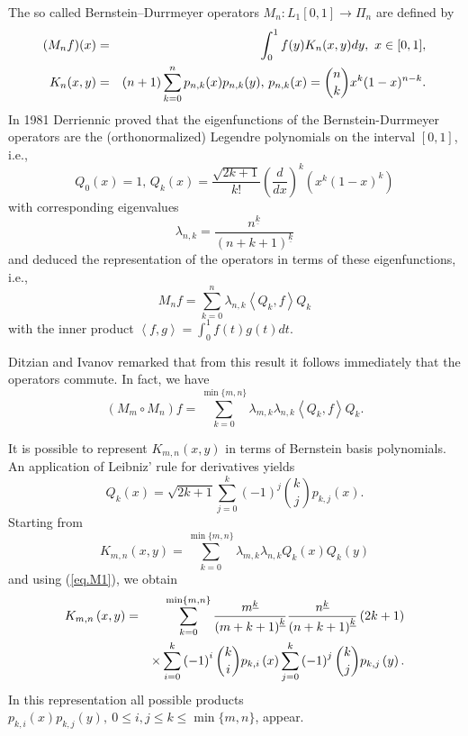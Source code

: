 \documentclass[12pt,reqno]{article}
\begin{document}
The so called Bernstein--Durrmeyer operators $M_{n}:L_{1}[0,1]%
\longrightarrow \Pi _{n}$ are defined by 
\begin{eqnarray*}
(M_{n}f)(x) &=&\int_{0}^{1}f(y)K_{n}(x,y)dy,\, \,x\in \lbrack 0,1], \\
K_{n}(x,y) &=&(n+1)\sum_{k=0}^{n}p_{n,k}(x)p_{n,k}(y),\,p_{n,k}(x)=\binom{n}{%
k}x^{k}(1-x)^{n-k}.
\end{eqnarray*}%
In 1981 Derriennic \cite[Th\'{e}or\`{e}me III.3]{De1981} proved that the
eigenfunctions of the Bernstein-Durrmeyer operators are the
(orthonormalized) Legendre polynomials on the interval $[0,1]$, i.e., 
\begin{equation*}
Q_{0}(x)=1,\,Q_{k}(x)=\frac{\sqrt{2k+1}}{k!}\left( \frac{d}{dx}\right)
^{k}\left( x^{k}\left( 1-x\right) ^{k}\right)
\end{equation*}%
with corresponding eigenvalues 
\begin{equation*}
\lambda _{n,k}=\frac{n^{\underline{k}}}{\left( n+k+1\right) ^{\underline{k}}}
\end{equation*}%
and deduced the representation of the operators in terms of these
eigenfunctions, i.e., 
\begin{equation*}
M_{n}f=\sum_{k=0}^{n}\lambda _{n,k}\left \langle Q_{k},f\right \rangle Q_{k}
\end{equation*}%
with the inner product $\left \langle f,g\right \rangle
=\int_{0}^{1}f(t)g(t)dt $.

Ditzian and Ivanov \cite{DiIv1989} remarked that from this result it follows
immediately that the operators commute. In fact, we have 
\begin{equation*}
(M_{m}\circ M_{n})f=\sum_{k=0}^{\min \{m,n\}}\lambda _{m,k}\lambda
_{n,k}\left \langle Q_{k},f\right \rangle Q_{k}.
\end{equation*}

It is possible to represent $K_{m,n}\left( x,y\right)$ in terms of Bernstein basis polynomials. An application of Leibniz' rule for derivatives yields 
\begin{equation}  \label{eq.M1}
Q_{k}\left( x\right) =\sqrt{2k+1}\sum_{j=0}^{k}\left( -1\right) ^{j}\binom{k 
}{j}p_{k,j}\left( x\right).
\end{equation}
Starting from 
\begin{equation*}
K_{m,n}\left( x,y\right) =\sum_{k=0}^{\min \{m,n\}}\lambda _{m,k}\lambda
_{n,k}Q_{k}\left( x\right) Q_{k}\left( y\right)
\end{equation*}%
and using (\ref{eq.M1}), we obtain 
\begin{eqnarray*}
K_{m,n}\left( x,y\right) &=&\sum_{k=0}^{\min \left \{ m,n\right \} }\frac{m^{%
\underline{k}}}{\left( m+k+1\right) ^{\underline{k}}}\frac{n^{\underline{k}}%
}{\left( n+k+1\right) ^{\underline{k}}}\left( 2k+1\right) \\
&&\times \sum_{i=0}^{k}\left( -1\right) ^{i}\binom{k}{i}p_{k,i}\left(
x\right) \sum_{j=0}^{k}\left( -1\right) ^{j}\binom{k}{j}p_{k,j}\left(
y\right) .
\end{eqnarray*}
In this representation all possible products $p_{k,i}\left(x\right) p_{k,j}\left(y \right), \ 0\le i,j \le k \le \min \{m,n\}$, appear.
\end{document}
